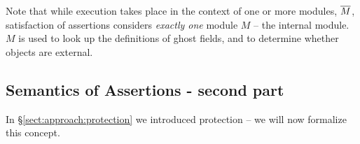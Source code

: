  
Note that while execution takes place in the context of one or more modules, $\overline{M}$, satisfaction of assertions considers \emph{exactly one} module  $M$ -- the internal module. 
{$M$} is used  to look up the definitions of ghost fields, and to %
 determine whether objects are  external.

\subsection{Semantics of Assertions - second part}  

\label{sect:protect}
%
%
%
%

In \S \ref{sect:approach:protection} we %
introduced protection -- we will now formalize this concept. %

